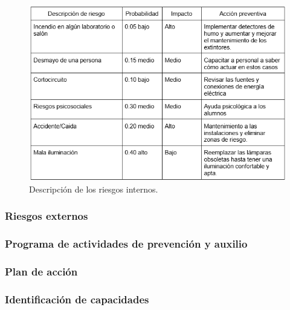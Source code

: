     \begin{figure}[H]
        \centering
        \includegraphics[scale=0.5]{35/Img/riesgosInternos.png}
        \caption{Descripción de los riesgos internos.}
    \end{figure}
    
    \subsubsection{Riesgos externos}
    
    \subsubsection{Programa de actividades de prevención y auxilio}
    
    \subsubsection{Plan de acción}
    
    \subsubsection{Identificación de capacidades}
    
